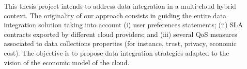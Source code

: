 \documentclass[11pt,a4paper,oneside]{report}
\begin{document}

This thesis project intends to address data integration in a multi-cloud hybrid context. The originality of our approach consists in guiding the entire data integration solution taking into account (i) user preferences statements; (ii) SLA contracts exported by different cloud providers; and (iii) several QoS measures associated to data collections properties (for instance, trust, privacy, economic cost). The objective is to propose data integration strategies adapted to the vision of the economic model of the cloud. %

\end{document}
